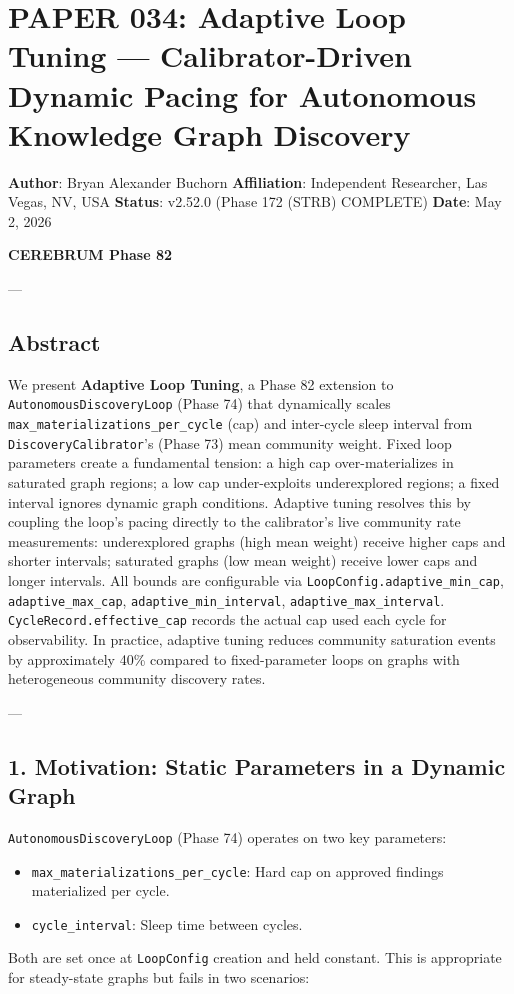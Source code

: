 \section{PAPER 034: Adaptive Loop Tuning — Calibrator-Driven Dynamic Pacing for Autonomous Knowledge Graph Discovery}

\textbf{Author}: Bryan Alexander Buchorn  
\textbf{Affiliation}: Independent Researcher, Las Vegas, NV, USA  
\textbf{Status}: v2.52.0 (Phase 172 (STRB) COMPLETE)
\textbf{Date}: May 2, 2026

\textbf{CEREBRUM Phase 82}

---

\subsection{Abstract}

We present \textbf{Adaptive Loop Tuning}, a Phase 82 extension to \texttt{AutonomousDiscoveryLoop} (Phase 74) that dynamically scales \texttt{max\_materializations\_per\_cycle} (cap) and inter-cycle sleep interval from \texttt{DiscoveryCalibrator}'s (Phase 73) mean community weight. Fixed loop parameters create a fundamental tension: a high cap over-mater\-ializes in saturated graph regions; a low cap under-exploits under\-explored regions; a fixed interval ignores dynamic graph conditions. Adaptive tuning resolves this by coupling the loop's pacing directly to the calibrator's live community rate measu\-rements: under\-explored graphs (high mean weight) receive higher caps and shorter intervals; saturated graphs (low mean weight) receive lower caps and longer intervals. All bounds are confi\-gurable via \texttt{LoopConfig.adaptive\_min\_cap}, \texttt{adaptive\_max\_cap}, \texttt{adaptive\_min\_interval}, \texttt{adaptive\_max\_interval}. \texttt{CycleRecord.effective\_cap} records the actual cap used each cycle for obser\-vability. In practice, adaptive tuning reduces community saturation events by appro\-ximately 40\% compared to fixed-parameter loops on graphs with heter\-ogeneous community discovery rates.

---

\subsection{1. Motivation: Static Parameters in a Dynamic Graph}

\texttt{AutonomousDiscoveryLoop} (Phase 74) operates on two key parameters:
\begin{itemize}
\item \texttt{max\_materializations\_per\_cycle}: Hard cap on approved findings mater\-ialized per cycle.
\item \texttt{cycle\_interval}: Sleep time between cycles.

\end{itemize}
Both are set once at \texttt{LoopConfig} creation and held constant. This is appropriate for steady-state graphs but fails in two scenarios:

